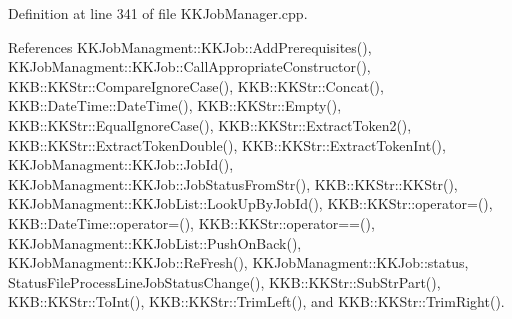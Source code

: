Definition at line 341 of file K\+K\+Job\+Manager.\+cpp.



References K\+K\+Job\+Managment\+::\+K\+K\+Job\+::\+Add\+Prerequisites(), K\+K\+Job\+Managment\+::\+K\+K\+Job\+::\+Call\+Appropriate\+Constructor(), K\+K\+B\+::\+K\+K\+Str\+::\+Compare\+Ignore\+Case(), K\+K\+B\+::\+K\+K\+Str\+::\+Concat(), K\+K\+B\+::\+Date\+Time\+::\+Date\+Time(), K\+K\+B\+::\+K\+K\+Str\+::\+Empty(), K\+K\+B\+::\+K\+K\+Str\+::\+Equal\+Ignore\+Case(), K\+K\+B\+::\+K\+K\+Str\+::\+Extract\+Token2(), K\+K\+B\+::\+K\+K\+Str\+::\+Extract\+Token\+Double(), K\+K\+B\+::\+K\+K\+Str\+::\+Extract\+Token\+Int(), K\+K\+Job\+Managment\+::\+K\+K\+Job\+::\+Job\+Id(), K\+K\+Job\+Managment\+::\+K\+K\+Job\+::\+Job\+Status\+From\+Str(), K\+K\+B\+::\+K\+K\+Str\+::\+K\+K\+Str(), K\+K\+Job\+Managment\+::\+K\+K\+Job\+List\+::\+Look\+Up\+By\+Job\+Id(), K\+K\+B\+::\+K\+K\+Str\+::operator=(), K\+K\+B\+::\+Date\+Time\+::operator=(), K\+K\+B\+::\+K\+K\+Str\+::operator==(), K\+K\+Job\+Managment\+::\+K\+K\+Job\+List\+::\+Push\+On\+Back(), K\+K\+Job\+Managment\+::\+K\+K\+Job\+::\+Re\+Fresh(), K\+K\+Job\+Managment\+::\+K\+K\+Job\+::status, Status\+File\+Process\+Line\+Job\+Status\+Change(), K\+K\+B\+::\+K\+K\+Str\+::\+Sub\+Str\+Part(), K\+K\+B\+::\+K\+K\+Str\+::\+To\+Int(), K\+K\+B\+::\+K\+K\+Str\+::\+Trim\+Left(), and K\+K\+B\+::\+K\+K\+Str\+::\+Trim\+Right().


